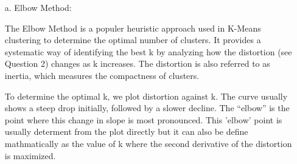 \documentclass[a3paper,12pt]{extarticle} %
\begin{document}
\begin{enumerate}
\begin{itemize}
\item[a.] Elbow Method:

The Elbow Method is a populer heuristic approach used in K-Means clustering to determine the optimal number of clusters. It provides a systematic way of identifying the best k by analyzing how the distortion (see Question 2) changes as k increases. The distortion is also referred to as inertia, which measures the compactness of clusters.

To determine the optimal k, we plot distortion against k. The curve usually shows a steep drop initially, followed by a slower decline. The ``elbow'' is the point where this change in slope is most pronounced. This 'elbow' point is usually determent from the plot directly but it can also be define mathmatically as the value of k where the second derivative of the distortion is maximized.


\end{itemize}
\end{enumerate}
\end{document}
